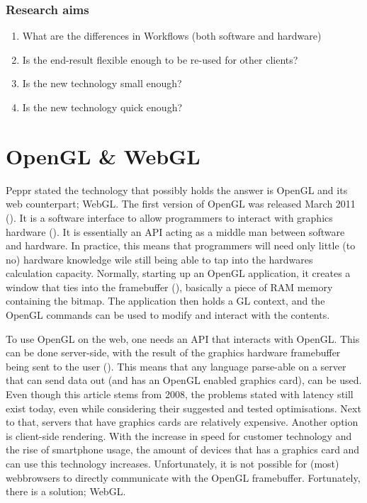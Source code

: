 \subsubsection{Research aims}
\begin{enumerate}
	\item {What are the differences in Workflows (both software and hardware)}
	\item {Is the end-result flexible enough to be re-used for other clients?}
	\item {Is the new technology small enough?}
	\item {Is the new technology quick enough?}
\end{enumerate}


\clearpage
\section{OpenGL \& WebGL}
Peppr stated the technology that possibly holds the answer is OpenGL and its web counterpart; WebGL.
The first version of OpenGL was released March 2011 (\cite{openGLsite}). It is a software interface to allow programmers to interact with graphics hardware (\cite{openGLSpecification}). It is essentially an API acting as a middle man between software and hardware. In practice, this means that programmers will need only little (to no) hardware knowledge wile still being able to tap into the hardwares calculation capacity. Normally, starting up an OpenGL application, it creates a window that ties into the framebuffer (\cite{framebuffer}), basically a piece of RAM memory containing the bitmap. The application then holds a GL context, and the OpenGL commands can be used to modify and interact with the contents.

To use OpenGL on the web, one needs an API that interacts with OpenGL. This can be done server-side, with the result of the graphics hardware framebuffer being sent to the user (\cite{CRRS}). This means that any language parse-able on a server that can send data out (and has an OpenGL enabled graphics card), can be used. Even though this article stems from 2008, the problems stated with latency still exist today, even while considering their suggested and tested optimisations. Next to that, servers that have graphics cards are relatively expensive. Another option is client-side rendering. With the increase in speed for customer technology and the rise of smartphone usage, the amount of devices that has a graphics card and can use this technology increases. Unfortunately, it is not possible for (most) webbrowsers to directly communicate with the OpenGL framebuffer. Fortunately, there is a solution; WebGL.

